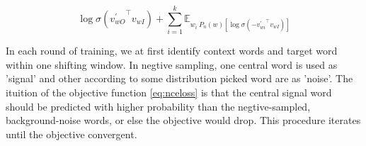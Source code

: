   \begin{equation}\label{eq:nceloss}
  \log{\sigma({v^\prime_{wO}}^\intercal v_{wI})}+\sum_{i=1}^k{\mathbb{E}_{w_i~P_n(w)[\log{\sigma({-v^\prime_{wi}}^\intercal v_{wI})}]}}
  \end{equation}

  In each round of training, we at first identify context words and target word within one shifting window. In negtive sampling, one central word is used as 'signal' and other according to some distribution picked word are as 'noise'. The ituition of the objective function \ref{eq:nceloss} is that the central signal word should be predicted with higher probability than the negtive-sampled, background-noise words, or else the objective would drop. This procedure iterates until the objective convergent.
